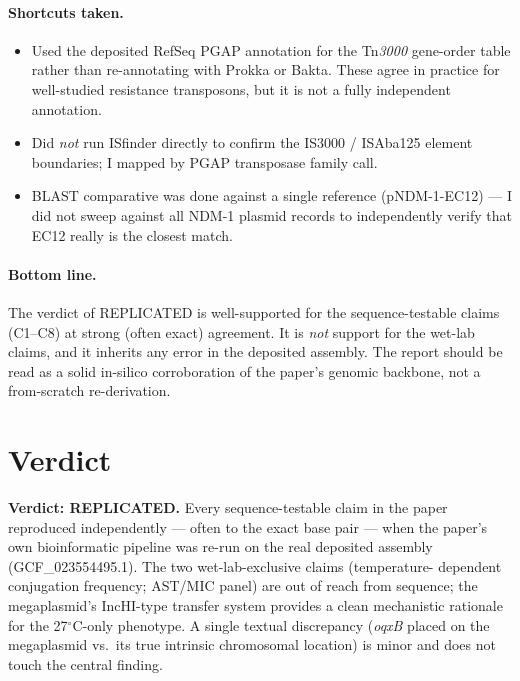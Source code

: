 \documentclass[11pt]{article}
\begin{document}
\paragraph{Shortcuts taken.}
\begin{itemize}[leftmargin=1.5em,itemsep=2pt]
  \item Used the deposited RefSeq PGAP annotation for the Tn\emph{3000}
    gene-order table rather than re-annotating with Prokka or Bakta.
    These agree in practice for well-studied resistance transposons, but
    it is not a fully independent annotation.
  \item Did \emph{not} run ISfinder directly to confirm the IS3000 /
    ISAba125 element boundaries; I mapped by PGAP transposase family
    call.
  \item BLAST comparative was done against a single reference
    (pNDM-1-EC12) --- I did not sweep against all NDM-1 plasmid records
    to independently verify that EC12 really is the closest match.
\end{itemize}

\paragraph{Bottom line.} The verdict of REPLICATED is well-supported for
the sequence-testable claims (C1--C8) at strong (often exact) agreement.
It is \emph{not} support for the wet-lab claims, and it inherits any
error in the deposited assembly. The report should be read as a solid
in-silico corroboration of the paper's genomic backbone, not a
from-scratch re-derivation.

\section{Verdict}
\textbf{Verdict: REPLICATED.} Every sequence-testable claim in the paper
reproduced independently --- often to the exact base pair --- when the
paper's own bioinformatic pipeline was re-run on the real deposited
assembly (GCF\_023554495.1). The two wet-lab-exclusive claims (temperature-
dependent conjugation frequency; AST/MIC panel) are out of reach from
sequence; the megaplasmid's IncHI-type transfer system provides a clean
mechanistic rationale for the 27$^\circ$C-only phenotype. A single textual
discrepancy (\emph{oqxB} placed on the megaplasmid vs.\ its true intrinsic
chromosomal location) is minor and does not touch the central finding.
\end{document}
